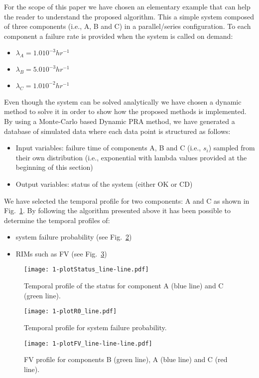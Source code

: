 For the scope of this paper we have chosen an elementary example that can help the reader to 
understand the proposed algorithm. This a simple system composed of three components 
(i.e., A, B and C) in a parallel/series configuration. To each component a failure rate is 
provided when the system is called on demand:
\begin{itemize}
  \item $\lambda_A=1.0 10^{-3} hr^{-1}$
  \item $\lambda_B=5.0 10^{-3} hr^{-1}$
  \item $\lambda_C=1.0 10^{-2} hr^{-1}$
\end{itemize}
  
Even though the system can be solved analytically we have chosen a dynamic method to solve it in 
order to show how the proposed methods is implemented. 
By using a Monte-Carlo based Dynamic PRA method, we have generated a database of simulated data 
where each data point is structured as follows:
\begin{itemize}
  \item Input variables: failure time of components A, B and C (i.e., $s_i$) sampled from their 
        own distribution (i.e., exponential with lambda values provided at the beginning of this section)
  \item Output variables: status of the system (either OK or CD)
\end{itemize}

We have selected the temporal profile for two components: A and C as shown in Fig.~\ref{fig:plotStatus_line-line}. 
By following the algorithm presented above it has been possible to determine the temporal profiles of:
\begin{itemize}
  \item system failure probability (see Fig.~\ref{fig:plotR0_line})
  \item RIMs such as FV (see Fig.~\ref{fig:plotFV_line-line-line}) 
\end{itemize}

\begin{figure}
    \centering
    \centerline{\texttt{[image: 1-plotStatus\_line-line.pdf]}}
    \caption{Temporal profile of the status for component A (blue line) and C (green line).}
    \label{fig:plotStatus_line-line}
\end{figure}

\begin{figure}
    \centering
    \centerline{\texttt{[image: 1-plotR0\_line.pdf]}}
    \caption{Temporal profile for system failure probability.}
    \label{fig:plotR0_line}
\end{figure}

\begin{figure}
    \centering
    \centerline{\texttt{[image: 1-plotFV\_line-line-line.pdf]}}
    \caption{FV profile for components B (green line), A (blue line) and C (red line).}
    \label{fig:plotFV_line-line-line}
\end{figure}


